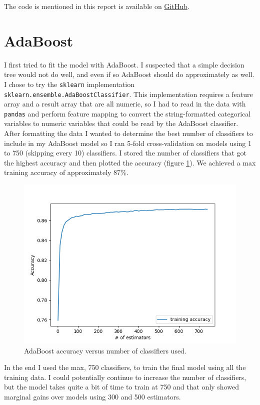 \documentclass{article}
\begin{document}
    The code is mentioned in this report is available on \href{https://github.com/jakobottar/2021-ml-project}{GitHub}.

    \section{AdaBoost}
        I first tried to fit the model with AdaBoost. I suspected that a simple decision tree would not do well, and even if so AdaBoost should do approximately as well. I chose to try the \lstinline{sklearn} implementation \lstinline{sklearn.ensemble.AdaBoostClassifier}. This implementation requires a feature array and a result array that are all numeric, so I had to read in the data with \lstinline{pandas} and perform feature mapping to convert the string-formatted categorical variables to numeric variables that could be read by the AdaBoost classifier.  \\

        After formatting the data I wanted to determine the best number of classifiers to include in my AdaBoost model so I ran 5-fold cross-validation on models using 1 to 750 (skipping every 10) classifiers. I stored the number of classifiers that got the highest accuracy and then plotted the accuracy (figure \ref{fig:ab_acc}). We achieved a max training accuracy of approximately 87\%.
        \begin{figure}[H]
            \centering
            \includegraphics[width=0.5\linewidth]{./img/ab_acc.png}
            \caption{AdaBoost accuracy versus number of classifiers used.}
            \label{fig:ab_acc}
        \end{figure}

        In the end I used the max, 750 classifiers, to train the final model using all the training data. I could potentially continue to increase the number of classifiers, but the model takes quite a bit of time to train at 750 and that only showed marginal gains over models using 300 and 500 estimators. \\
\end{document}
